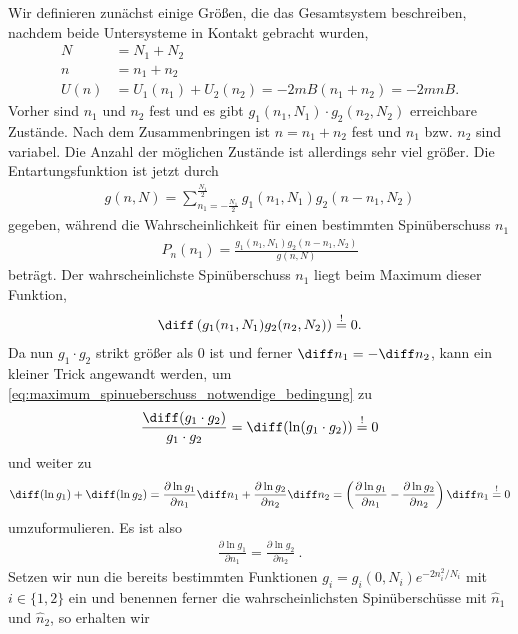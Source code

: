Wir definieren zunächst einige Größen, die das Gesamtsystem beschreiben, nachdem beide Untersysteme in Kontakt gebracht wurden,
\begin{align*}
    N    & = N_1+N_2                                 \\
    n    & = n_1+n_2                                 \\
    U(n) & =U_1(n_1)+U_2(n_2) = -2mB(n_1+n_2)=-2mnB.
\end{align*}
Vorher sind $n_1$ und $n_2$ fest und es gibt $g_1(n_1,N_1)\cdot g_2(n_2,N_2)$ erreichbare Zustände. Nach dem Zusammenbringen ist $n=n_1+n_2$ fest und $n_1$ bzw. $n_2$ sind variabel. Die Anzahl der möglichen Zustände ist allerdings sehr viel größer. Die Entartungsfunktion ist jetzt durch
\begin{align*}
    g(n,N) = \sum_{n_1=-\frac{N_1}{2}}^{\frac{N_1}{2}} g_1(n_1,N_1)g_2(n-n_1,N_2)
\end{align*}
gegeben, während die Wahrscheinlichkeit für einen bestimmten Spinüberschuss $n_1$
\begin{align*}
    P_n(n_1) = \frac{g_1(n_1,N_1)g_2(n-n_1,N_2)}{g(n,N)}
\end{align*}
beträgt. Der wahrscheinlichste Spinüberschuss $n_1$ liegt beim Maximum dieser Funktion,
\begin{align}
    \label{eq:maximum_spinueberschuss_notwendige_bedingung}
    \diff \left(g_1(n_1,N_1)g_2(n_2,N_2)\right) \overset{!}{=} 0. 
\end{align}
Da nun $g_1\cdot g_2$ strikt größer als $0$ ist und ferner $\diff n_1=-\diff n_2$, kann ein kleiner Trick angewandt werden, um \eqref{eq:maximum_spinueberschuss_notwendige_bedingung} zu 
\begin{align*}
    \frac{\diff(g_1\cdot g_2)}{g_1\cdot g_2}=\diff(\ln(g_1\cdot g_2)) \overset{!}{=} 0
\end{align*}
und weiter zu 
\begin{align*}
    \diff(\ln g_1) + \diff(\ln g_2) = \frac{\partial \ln g_1}{\partial n_1} \diff n_1 + \frac{\partial \ln g_2}{\partial n_2} \diff n_2 = \left(\frac{\partial \ln g_1}{\partial n_1} - \frac{\partial \ln g_2}{\partial n_2}\right) \diff n_1  \overset{!}{=} 0
\end{align*}
umzuformulieren. Es ist also 
\begin{align}
    \label{eq:bedingung_wahrscheinlichster_spinueberschuss}
    \boxed{\frac{\partial \ln g_1}{\partial n_1}  = \frac{\partial \ln g_2}{\partial n_2} }\:.
\end{align}
Setzen wir nun die bereits bestimmten Funktionen $g_i=g_i(0,N_i) e^{-2n_i^2/N_i}$ mit $i\in\{1,2\}$ ein und benennen ferner die wahrscheinlichsten Spinüberschüsse mit $\hat{n}_1$ und $\hat{n}_2$, so erhalten wir 
